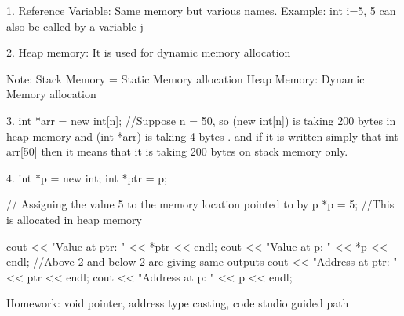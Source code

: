 1. Reference Variable: Same memory but various names. Example: int i=5, 5 can also be called by a variable j

2. Heap memory: It is used for dynamic memory allocation

Note: Stack Memory = Static Memory allocation
      Heap Memory: Dynamic Memory allocation

3. int *arr = new int[n];
//Suppose n = 50, so (new int[n]) is taking 200 bytes in heap memory and (int *arr) is taking 4 bytes .
and if it is written simply that int arr[50] then it means that it is taking 200 bytes on stack memory only.

4. int *p = new int;
int *ptr = p;

// Assigning the value 5 to the memory location pointed to by p
*p = 5; //This is allocated in heap memory

cout << "Value at ptr: " << *ptr << endl;
cout << "Value at p: " << *p << endl;
//Above 2 and below 2 are giving same outputs
cout << "Address at ptr: " << ptr << endl;
cout << "Address at p: " << p << endl;

Homework: void pointer, address type casting, code studio guided path

